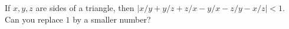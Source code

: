 If $x, y, z$ are sides of a triangle, then $|x/y + y/z + z/x - y/x - z/y - x/z| < 1$. Can you replace $1$ by a smaller number?
